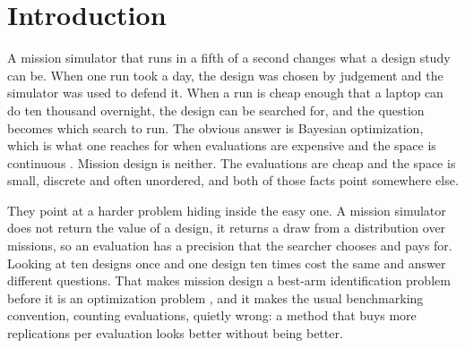 \documentclass[11pt]{article}
\begin{document}
\begin{abstract}
Establishing the answer key made the cost measurable, and it is severe. Only \BnKeyResolved{} of the
\BnKeyProblems{} problems separate their own top two designs at two standard errors, none of the
mission-success problems do, and on that axis a key built from \BnRepsSucc{} missions per design can
only separate two designs differing by a median \BnKeyDetSucc{} percent of the entire distance from
best design to worst. The spread across the design set is nonetheless large, at least
\BnSpreadOverGapMed{} times the gap between the best two, so choosing a good design is affordable
while proving which is best is not, by a factor of at least \BnCheaper{}. We therefore grade
normalized regret and carry argmax recovery as a flag, and we argue that a requirement written from
the argmax of a mission sweep is usually written from noise.
\end{abstract}

\section{Introduction}
\label{sec:intro}

A mission simulator that runs in a fifth of a second changes what a design study can be. When one
run took a day, the design was chosen by judgement and the simulator was used to defend it. When a
run is cheap enough that a laptop can do ten thousand overnight, the design can be searched for, and
the question becomes which search to run. The obvious answer is Bayesian optimization, which is what
one reaches for when evaluations are expensive and the space is continuous \citep{shahriari2016taking,
brochu2010tutorial}. Mission design is neither. The evaluations are cheap and the space is small,
discrete and often unordered, and both of those facts point somewhere else.

They point at a harder problem hiding inside the easy one. A mission simulator does not return the
value of a design, it returns a draw from a distribution over missions, so an evaluation has a
precision that the searcher chooses and pays for. Looking at ten designs once and one design ten
times cost the same and answer different questions. That makes mission design a best-arm
identification problem before it is an optimization problem \citep{bubeck2011pure,karnin2013almost},
and it makes the usual benchmarking convention, counting evaluations, quietly wrong: a method that
buys more replications per evaluation looks better without being better.
\end{document}
